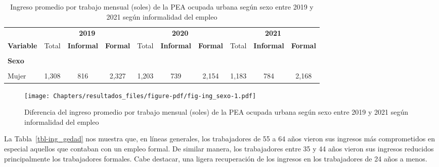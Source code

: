 \documentclass[
  letterpaper,
  12pt,
  oneside,
  spanish,
  doublespacing,
  headsepline,
  parskip]{MastersDoctoralThesis}
\begin{document}
\hypertarget{tbl-ing_sexo}{}
\begin{table}[H]
\caption{\label{tbl-ing_sexo}Ingreso promedio por trabajo mensual (soles) de la PEA ocupada urbana
según sexo entre 2019 y 2021 según informalidad del empleo }\tabularnewline

\centering\begingroup\fontsize{9}{11}\selectfont

\begin{tabular}{lccccccccc}
\toprule
\multicolumn{1}{c}{ } & \multicolumn{3}{c}{\textbf{2019}} & \multicolumn{3}{c}{\textbf{2020}} & \multicolumn{3}{c}{\textbf{2021}} \\
\cmidrule(l{3pt}r{3pt}){2-4} \cmidrule(l{3pt}r{3pt}){5-7} \cmidrule(l{3pt}r{3pt}){8-10}
\textbf{Variable} & Total & \textbf{Informal} & \textbf{Formal} & Total & \textbf{Informal} & \textbf{Formal} & Total & \textbf{Informal} & \textbf{Formal}\\
\midrule
\cellcolor{gray!6}{\textbf{Nacional}} & \cellcolor{gray!6}{1,595} & \cellcolor{gray!6}{1,037} & \cellcolor{gray!6}{2,599} & \cellcolor{gray!6}{1,407} & \cellcolor{gray!6}{901} & \cellcolor{gray!6}{2,380} & \cellcolor{gray!6}{1,443} & \cellcolor{gray!6}{989} & \cellcolor{gray!6}{2,473}\\
\textbf{Sexo} &  &  &  &  &  &  &  &  & \\
\cellcolor{gray!6}{Hombre} & \cellcolor{gray!6}{1,819} & \cellcolor{gray!6}{1,225} & \cellcolor{gray!6}{2,778} & \cellcolor{gray!6}{1,549} & \cellcolor{gray!6}{1,018} & \cellcolor{gray!6}{2,527} & \cellcolor{gray!6}{1,639} & \cellcolor{gray!6}{1,150} & \cellcolor{gray!6}{2,680}\\
Mujer & 1,308 & 816 & 2,327 & 1,203 & 739 & 2,154 & 1,183 & 784 & 2,168\\
\bottomrule
\end{tabular}
\endgroup{}
\end{table}

\begin{figure}

\caption{\label{fig-ing_sexo}Diferencia del ingreso promedio por trabajo
mensual (soles) de la PEA ocupada urbana según sexo entre 2019 y 2021
según informalidad del empleo}

{\centering \texttt{[image: Chapters/resultados\_files/figure-pdf/fig-ing\_sexo-1.pdf]}

}

\end{figure}

La Tabla~\ref{tbl-ing_gedad} nos muestra que, en líneas generales, los
trabajadores de 55 a 64 años vieron sus ingresos más comprometidos en
especial aquellos que contaban con un empleo formal. De similar manera,
los trabajadores entre 35 y 44 años vieron sus ingresos reducidos
principalmente los trabajadores formales. Cabe destacar, una ligera
recuperación de los ingresos en los trabajadores de 24 años a menos.
\end{document}
